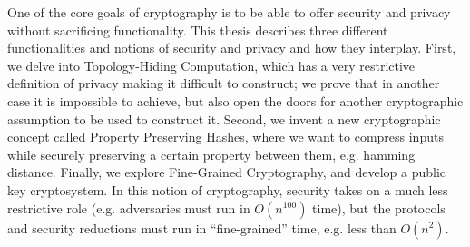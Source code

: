% 
% 
%
One of the core goals of cryptography is to be able to offer security and privacy without sacrificing functionality. This thesis describes three different functionalities and notions of security and privacy and how they interplay. First, we delve into Topology-Hiding Computation, which has a very restrictive definition of privacy making it difficult to construct; we prove that in another case it is impossible to achieve, but also open the doors for another cryptographic assumption to be used to construct it. Second, we invent a new cryptographic concept called Property Preserving Hashes, where we want to compress inputs while securely preserving a certain property between them, e.g. hamming distance. Finally, we explore Fine-Grained Cryptography, and develop a public key cryptosystem. In this notion of cryptography, security takes on a much less restrictive role (e.g. adversaries must run in $O(n^{100})$ time), but the protocols and security reductions must run in ``fine-grained'' time, e.g. less than $O(n^2)$.
